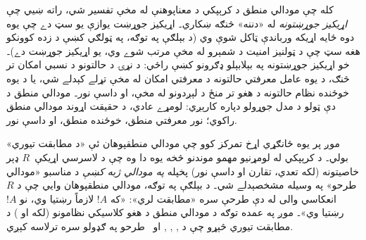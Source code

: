 \documentclass[../../../include/open-logic-section]{subfiles}
\begin{document}
کله چې مودالي منطق د کرېپکي د معناپوهنې له مخې تفسير شي، راته ښيي
چې \emph{اړيکيز جوړښتونه} له «دننه» څنګه ښکاري۔ اړيکيز جوړښت يوازې
يو سټ دے چې يوه دوه ځايه اړيکه ورباندې ټاکل شوې وي (د بېلګې په
توګه، په ټولګي کښې د زده کوونکو هغه سټ چې د ټولنيز امنيت د شمېرو له
مخې مرتب شوے وي، يو اړيکيز جوړښت دے)۔ خو اړيکيز جوړښتونه په
بېلابېلو ډګرونو کښې راځي: د نړۍ د حالتونو د نسبي امکان تر څنګ، د
يوه عامل معرفتي حالتونه د معرفتي امکان له مخې تړلے کېدلے شي، يا د
يوه خوځنده نظام حالتونه د هغو تر منځ د لېږدونو له مخې، او داسې نور۔
مودالي منطق د دې ټولو د مدل جوړولو دپاره کارېږي: لومړے عادي، د
حقيقت اړوند مودالي منطق راکوي؛ نور معرفتي منطق، خوځنده منطق، او
داسې نور.

موږ پر يوه ځانګړي اړخ تمرکز کوو چې مودالي منطقپوهان ئې «د مطابقت
تيوري» بولي۔ د کرېپکي له لومړنيو مهمو موندنو څخه يوه دا وه چې د
لاسرسي اړيکې~$R$ ډېر خاصيتونه (لکه تعدي، تقارن او داسې نور) پخپله
\emph{په مودالي ژبه کښې} د مناسبو «مودالي طرحو» په وسيله مشخصېدلے
شي۔ د بېلګې په توګه، مودالي منطقپوهان وايي چې د $R$ انعکاسي والی له
دې طرحې سره «مطابقت لري»: «که $!A$ لازماً رښتيا وي، نو $!A$ رښتيا
وي»۔ موږ په عمده توګه د مودالي منطق د هغو کلاسيکي نظامونو (لکه
 او ) د مطابقت تيوري څېړو چې د , ,
,  او~ طرحو په ګډولو سره ترلاسه کېږي.
\end{document}
